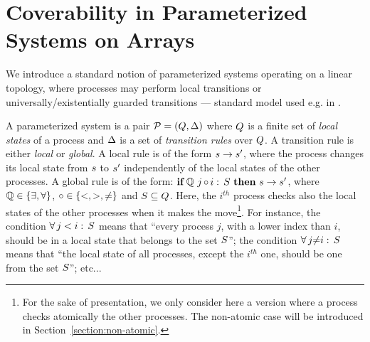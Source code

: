 \section{Coverability in Parameterized Systems on Arrays}
\label{section:paramsys}
%
We introduce a standard notion of parameterized systems operating on a
linear topology, where processes may perform local transitions or
universally/existentially guarded transitions --- standard model used
e.g. in \cite{PRZ-tacas01,CTV06,rmc:wo:transducers,Namjoshi:VMCAI07}.

A parameterized system is a pair ${\mathcal P}=(Q,\Delta)$ where
$Q$ is a finite set of \emph{local states} of a process and
$\Delta$ is a set of \emph{transition rules} over $Q$.  A
transition rule is either {\it local} or {\it global}.
%
A local rule is of the form $s\rightarrow s'$, where the process
changes its local state from $s$ to $s'$ independently of the
local states of the other processes.
%
A global rule is of the form: 
$\quantrule{\loc}{\loc'}{\quantify}{\circ}{S}$, where
$\mathbb{Q}\in\{\exists,\forall\}$, $\circ\in\{<,>,\neq\}$ and
$S\subseteq Q$.
%
Here, the $i^{th}$ process checks also the local states of the other
processes when it makes the move\footnote{For the sake of
presentation, we only consider here a version where a process checks
atomically the other processes. The non-atomic case will be
introduced in Section~\ref{section:non-atomic}.}.
%
For instance, the condition $\forall\,j<i:\,S$ means that
“every process $j$, with a lower index than $i$, should be in a local
state that belongs to the set $S$”; the condition
$\forall\,j{\neq}i:\,S$ means that “the local state of all
processes, except the $i^{th}$ one, should be one from the set
$S$”; etc...
%

